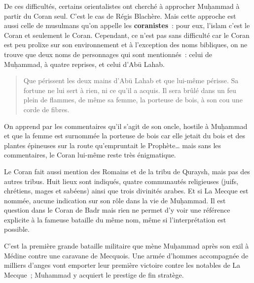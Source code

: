 De ces difficultés, certains orientalistes ont cherché à approcher
Muḥammad à partir du Coran seul. C'est le cas de Régis Blachère. Mais
cette approche est aussi celle de musulmans qu'on appelle les
\textbf{coranistes}~: pour eux, l'islam c'est le Coran et seulement le
Coran. Cependant, ce n'est pas sans difficulté car le Coran est peu
prolixe sur son environnement et à l'exception des noms bibliques, on ne
trouve que deux noms de personnages qui sont mentionnés~: celui de
Muḥammad, à quatre reprises, et celui d'Abū Lahab.


\begin{quote}
    Que périssent les deux mains d'Abū Lahab
et que lui-même périsse. Sa fortune ne lui sert à rien, ni ce qu'il a
acquis. Il sera brûlé dans un feu plein de flammes, de même sa femme, la
porteuse de bois, à son cou une corde de fibres.
\end{quote}


On apprend par les commentaires qu'il
s'agit de son oncle, hostile à Muḥammad et que la femme est surnommée la
porteuse de bois car elle jetait du bois et des plantes épineuses sur la
route qu'empruntait le Prophète\ldots{} mais sans les commentaires, le
Coran lui-même reste très énigmatique.


Le Coran fait aussi mention des Romains et de la tribu de Quraysh, mais
pas des autres tribus. Huit lieux sont indiqués, quatre communautés
religieuses (juifs, chrétiens, mages et sabéens) ainsi que trois
divinités arabes. Et si La Mecque est nommée, aucune indication sur son
rôle dans la vie de Muḥammad. Il est question dans le Coran de Badr mais
rien ne permet d'y voir une référence explicite à la fameuse bataille du
même nom, même si l'interprétation est possible.


C'est la première grande bataille militaire que mène Muḥammad après son
exil à Médine contre une caravane de Mecquois. Une armée d'hommes
accompagnée de milliers d'anges vont emporter leur première victoire
contre les notables de La Mecque~; Muhammad y acquiert le prestige de
fin stratège.

